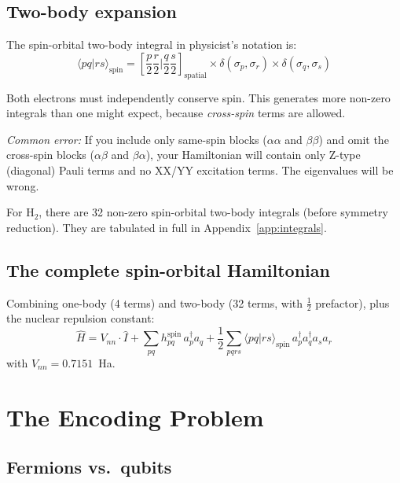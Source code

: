 \documentclass[aps,prb,preprint,longbibliography,nofootinbib]{revtex4-2}
\begin{document}
\subsection{Two-body expansion}

The spin-orbital two-body integral in physicist's notation is:
\begin{equation}
\langle pq|rs\rangle_\text{spin}
  = \left[\frac{p}{2}\frac{r}{2}\bigg|\frac{q}{2}\frac{s}{2}\right]_\text{spatial}
    \times \delta(\sigma_p, \sigma_r) \times \delta(\sigma_q, \sigma_s)
\end{equation}

Both electrons must independently conserve spin.  This generates more
non-zero integrals than one might expect, because \emph{cross-spin}
terms are allowed.

\emph{Common error:}  If you include only same-spin blocks
($\alpha\alpha$ and $\beta\beta$) and omit the cross-spin blocks
($\alpha\beta$ and $\beta\alpha$), your Hamiltonian will contain only
Z-type (diagonal) Pauli terms and no XX/YY excitation terms.  The
eigenvalues will be wrong.

For H$_2$, there are 32 non-zero spin-orbital two-body integrals
(before symmetry reduction).  They are tabulated in full in
Appendix~\ref{app:integrals}.

\subsection{The complete spin-orbital Hamiltonian}

Combining one-body (4 terms) and two-body (32 terms, with $\frac{1}{2}$
prefactor), plus the nuclear repulsion constant:
\begin{equation}
\hat{H} = V_{nn}\cdot\hat{I}
         + \sum_{pq} h^\text{spin}_{pq}\, a^\dagger_p a_q
         + \frac{1}{2}\sum_{pqrs}
           \langle pq|rs\rangle_\text{spin}\, a^\dagger_p a^\dagger_q a_s a_r
\end{equation}
with $V_{nn} = 0.7151$~Ha.

\section{The Encoding Problem}
\label{sec:encoding}

\subsection{Fermions vs.\ qubits}
\end{document}
